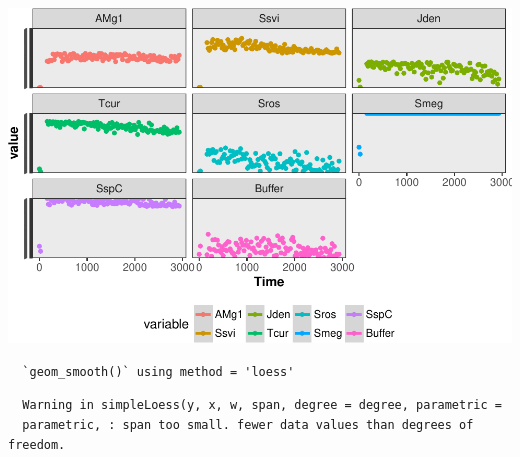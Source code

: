 \documentclass[12pt,twoside]{reedthesis}
\begin{document}
  \begin{center}\includegraphics{tesis_files/figure-latex/activity-3} \end{center}
  
  \begin{Shaded}
  \begin{Highlighting}[]
  \NormalTok{(}\StringTok{ }\NormalTok{()+}\StringTok{ }\NormalTok{()+}\NormalTok{()+}\NormalTok{(} \NormalTok{(} \NormalTok{, } \NormalTok{), } \NormalTok{(} \NormalTok{), } \NormalTok{(}\NormalTok{), }\NormalTok{(} \NormalTok{,} \NormalTok{), } \NormalTok{)+}\StringTok{ }\NormalTok{()}
  \end{Highlighting}
  \end{Shaded}
  
  \begin{verbatim}
  `geom_smooth()` using method = 'loess'
  \end{verbatim}
  
  \begin{verbatim}
  Warning in simpleLoess(y, x, w, span, degree = degree, parametric =
  parametric, : span too small. fewer data values than degrees of freedom.
  \end{verbatim}
  
\end{document}
